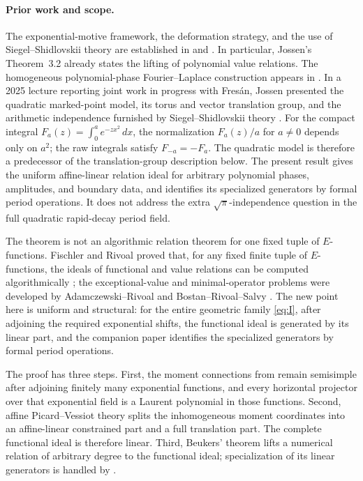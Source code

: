 \documentclass[11pt]{article}
\numberwithin{equation}{section}
\theoremstyle{definition}
\theoremstyle{remark}
\begin{document}
\paragraph{Prior work and scope.}
The exponential-motive framework, the deformation strategy, and the use of
Siegel--Shidlovskii theory are established in
\cite[\S\S12.5--12.7]{FresanJossenExp} and
\cite[\S\S2--3]{Jossen2018}.  In particular, Jossen's Theorem~3.2 already
states the lifting of polynomial value relations.  The homogeneous
polynomial-phase Fourier--Laplace construction appears in
\cite[Proposition~5.1]{FresanJossen}.  In a 2025 lecture reporting joint work
in progress with Fres\'an, Jossen presented the quadratic marked-point
model, its torus and vector translation group, and the arithmetic
independence furnished by Siegel--Shidlovskii theory \cite{Jossen2025}.
For the compact integral $F_a(z)=\int_0^a e^{-zx^2}\,dx$, the normalization
$F_a(z)/a$ for $a\ne0$ depends only on $a^2$; the raw integrals satisfy
$F_{-a}=-F_a$.  The quadratic model is therefore a predecessor of the
translation-group description below.  The present
result gives the uniform affine-linear relation ideal for arbitrary
polynomial phases, amplitudes, and boundary data, and identifies its
specialized generators by formal period operations.  It does not address
the extra $\sqrt\pi$-independence question in the full quadratic rapid-decay
period field.

The theorem is not an algorithmic relation theorem for one fixed tuple of
$E$-functions.  Fischler and Rivoal proved that, for any fixed finite tuple of
$E$-functions, the ideals of functional and value relations can be computed
algorithmically \cite{FischlerRivoalEffective}; the exceptional-value and
minimal-operator problems were developed by Adamczewski--Rivoal and
Bostan--Rivoal--Salvy \cite{AdamczewskiRivoal,BostanRivoalSalvy}.  The new
point here is uniform and structural: for the entire geometric family
\eqref{eq:I}, after adjoining the required exponential shifts, the functional
ideal is generated by its linear part, and the companion paper identifies the
specialized generators by formal period operations.

The proof has three steps.  First, the moment connections from
\cite{LongEIT} remain semisimple after adjoining finitely many exponential
functions, and every horizontal projector over that exponential field is a
Laurent polynomial in those functions.  Second, affine Picard--Vessiot theory
splits the inhomogeneous moment coordinates into an affine-linear constrained
part and a full translation part.  The complete functional ideal is therefore
linear.  Third, Beukers' theorem lifts a numerical relation of arbitrary
degree to the functional ideal; specialization of its linear generators is
handled by \cite{LongLinearKZ}.
\end{document}
